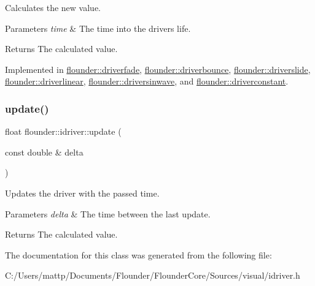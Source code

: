 Calculates the new value. 


\begin{DoxyParams}{Parameters}
{\em time} & The time into the drivers life. \\
\hline
\end{DoxyParams}
\begin{DoxyReturn}{Returns}
The calculated value. 
\end{DoxyReturn}


Implemented in \hyperlink{classflounder_1_1driverfade_af0720c2a60e768dfa9702a43969bf65d}{flounder\+::driverfade}, \hyperlink{classflounder_1_1driverbounce_a2781832b47206849a0028ee75a4772e4}{flounder\+::driverbounce}, \hyperlink{classflounder_1_1driverslide_aecbe9478f7ea9b1a781413f9284643c6}{flounder\+::driverslide}, \hyperlink{classflounder_1_1driverlinear_a7f645c05d7a8bdb555bbf70aca7c630e}{flounder\+::driverlinear}, \hyperlink{classflounder_1_1driversinwave_ae5c3d8d4bd38082ad2b0396029d45e66}{flounder\+::driversinwave}, and \hyperlink{classflounder_1_1driverconstant_acf786b61ab46ea1ebf8d9a802c33c441}{flounder\+::driverconstant}.

\mbox{\label{classflounder_1_1idriver_a1131c4e506fa5bfe3fae51b6636a09a9}} 
\subsubsection{\texorpdfstring{update()}{update()}}
{\footnotesize\ttfamily float flounder\+::idriver\+::update (\begin{DoxyParamCaption}\item[{const double \&}]{delta }\end{DoxyParamCaption})\hspace{0.3cm}{\ttfamily [inline]}}



Updates the driver with the passed time. 


\begin{DoxyParams}{Parameters}
{\em delta} & The time between the last update. \\
\hline
\end{DoxyParams}
\begin{DoxyReturn}{Returns}
The calculated value. 
\end{DoxyReturn}


The documentation for this class was generated from the following file\+:\begin{DoxyCompactItemize}
\item 
C\+:/\+Users/mattp/\+Documents/\+Flounder/\+Flounder\+Core/\+Sources/visual/idriver.\+h\end{DoxyCompactItemize}
